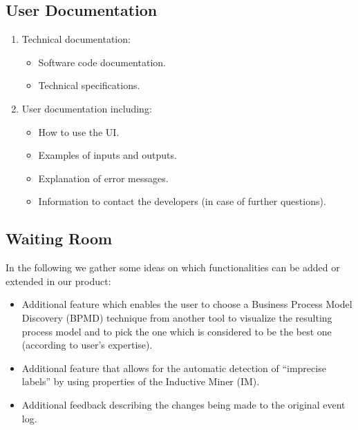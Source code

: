 \documentclass[notitlepage]{article}
\begin{document}
\begin{flushleft}

\subsection{User Documentation}
\begin{enumerate}
\item Technical documentation: 
\begin{itemize}
  \item Software code documentation.
  \item Technical specifications.
\end{itemize}

\item User documentation including:
\begin{itemize}
\item How to use the UI. 
\item Examples of inputs and outputs.
\item Explanation of error messages.
\item Information to contact the developers (in case of further questions).
\end{itemize}
\end{enumerate}

\subsection{Waiting Room}
In the following we gather some ideas on which functionalities can be added or extended in our product:

\begin{itemize}
\item Additional feature which enables the user to choose a Business Process Model Discovery (BPMD) technique from another tool to visualize the resulting process model and to pick the one which is considered to be the best one (according to user's expertise). 
\item Additional feature that allows for the automatic detection of “imprecise labels” by using properties of the Inductive Miner (IM).
\item Additional feedback describing the changes being made to the original event log.
\end{itemize}





\end{flushleft}
%
\end{document}

